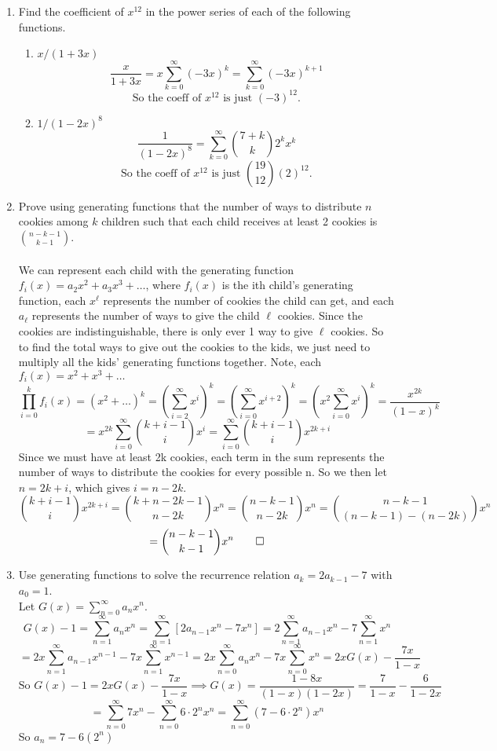 \documentclass[12pt]{article}
\begin{document}
\begin{enumerate}
\medskip

\item Find the coefficient of $x^{12}$ in the power series of each of the following functions.
\begin{enumerate}
\item $x/(1+3x)$
\[\frac{x}{1+3x} = x\sum_{k=0}^{\infty}(-3x)^k = \sum_{k=0}^{\infty}(-3x)^{k+1}\]
\[\text{So the coeff of } x^{12} \text{ is just } (-3)^{12}.\]
\item $1/(1-2x)^8$
\[\frac{1}{(1-2x)^8}=\sum_{k=0}^{\infty}\binom{7+k}{k}2^kx^k\]
\[\text{So the coeff of } x^{12} \text{ is just } \binom{19}{12}(2)^{12}.\]
\end{enumerate}

\medskip
\item Prove using generating functions that the number of ways to distribute $n$ cookies among $k$ children such that each child receives at least 2 cookies is ${n-k-1 \choose k-1}$. \\\\
We can represent each child with the generating function $f_i(x)=a_2x^2+a_3x^3+\ldots$, where $f_i(x)$ is the ith child's generating function, each $x^\ell$ represents the number of cookies the child can get, and each $a_\ell$ represents the number of ways to give the child $\ell$ cookies. Since the cookies are indistinguishable, there is only ever 1 way to give $\ell$ cookies. So to find the total ways to give out the cookies to the kids, we just need to multiply all the kids' generating functions together. Note, each $f_i(x)=x^2+x^3+\ldots$
\[\prod_{i=0}^{k}f_i(x) = (x^2+\ldots)^k = (\sum_{i=2}^{\infty}x^i)^k = (\sum_{i=0}^{\infty}x^{i+2})^k = (x^2\sum_{i=0}^{\infty}x^i)^k=\frac{x^{2k}}{(1-x)^k}\]
\[=x^{2k}\sum_{i=0}^{\infty}\binom{k+i-1}{i}x^i = \sum_{i=0}^{\infty}\binom{k+i-1}{i}x^{2k+i}\]
Since we must have at least 2k cookies, each term in the sum represents the number of ways to distribute the cookies for every possible n. So we then let $n=2k+i$, which gives $i=n-2k$.
\[\binom{k+i-1}{i}x^{2k+i}=\binom{k+n-2k-1}{n-2k}x^{n} = \binom{n-k-1}{n-2k}x^{n} =\binom{n-k-1}{(n-k-1)-(n-2k)}x^{n} \]
\[= \binom{n-k-1}{k-1}x^{n} \qed\] 
\medskip

\item Use generating functions to solve the recurrence relation $a_k = 2a_{k-1} -7$ with $a_0 = 1$. \\
Let $G(x)=\sum_{n=0}^{\infty}a_nx^n$.
\[G(x)-1 = \sum_{n=1}^{\infty}a_nx^n = \sum_{n=1}^{\infty}[2a_{n-1}x^n-7x^n] = 2\sum_{n=1}^{\infty}a_{n-1}x^n-7\sum_{n=1}^{\infty}x^n\]
\[=2x\sum_{n=1}^{\infty}a_{n-1}x^{n-1}-7x\sum_{n=1}^{\infty}x^{n-1} = 2x\sum_{n=0}^{\infty}a_{n}x^{n}-7x\sum_{n=0}^{\infty}x^{n} = 2xG(x)-\frac{7x}{1-x}\]
\[\text{So }G(x)-1=2xG(x)-\frac{7x}{1-x} \implies G(x)=\frac{1-8x}{(1-x)(1-2x)} = \frac{7}{1-x}-\frac{6}{1-2x}\]
\[= \sum_{n=0}^{\infty}7x^n -\sum_{n=0}^{\infty}6\cdot2^nx^n = \sum_{n=0}^{\infty}(7-6\cdot2^n)x^n\]
So $a_n = 7-6(2^n)$
\medskip


\end{enumerate}
\end{document}
